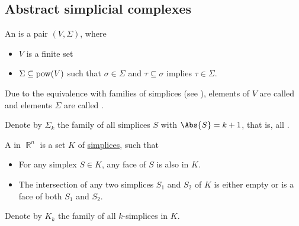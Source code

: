 \subsection{Abstract simplicial complexes}\label{subsec:abstract_simplicial_complexes}

\begin{definition}\label{def:abstract_simplicial_complex}
  An  is a pair \( (V, \Sigma) \), where
  \begin{itemize}
    \item \( V \) is a finite set
    \item \( \Sigma \subseteq \operatorname{pow}(V) \) such that \( \sigma \in \Sigma \) and \( \tau \subseteq \sigma \) implies \( \tau \in \Sigma \).
  \end{itemize}

  Due to the equivalence with families of simplices (see ), elements of \( V \) are called  and elements \( \Sigma \) are called .

  Denote by \( \Sigma_k \) the family of all simplices \( S \) with \( \Abs{S} = k + 1 \), that is, all .
\end{definition}

\begin{definition}\label{def:simplicial_complex}
  A  in \( \BbbR^n \) is a set \( K \) of \hyperref[def:simplex]{simplices}, such that
  \begin{itemize}
    \item For any simplex \( S \in K \), any face of \( S \) is also in \( K \).
    \item The intersection of any two simplices \( S_1 \) and \( S_2 \) of \( K \) is either empty or is a face of both \( S_1 \) and \( S_2 \).
  \end{itemize}

  Denote by \( K_k \) the family of all \( k \)-simplices in \( K \).
\end{definition}

